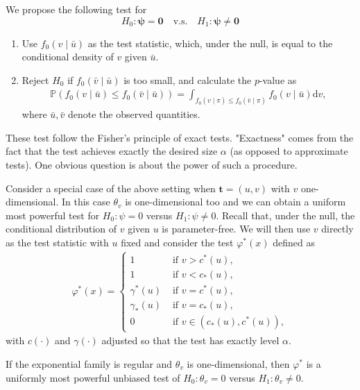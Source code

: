 We propose the following test for 
$$
H_0: \boldsymbol{\psi}=\mathbf{0}\quad \text{v.s.}\quad H_1: \boldsymbol{\psi} \neq \mathbf{0}
$$
\begin{enumerate}
    \item Use $f_0(v \mid \bar{u})$ as the test statistic, which, under the null, is equal to the conditional density of $v$ given $\bar{u}$.
    \item Reject $H_0$ if $f_0(\bar{v} \mid \bar{u})$ is too small, and calculate the $p$-value as
\begin{align*}
\mathbb{P}\left(f_0(v \mid \bar{u}) \leq f_0(\bar{v} \mid \bar{u})\right)=\int_{f_0(v \mid \pi) \leq f_0(\bar{v} \mid \pi)} f_0(v \mid \bar{u}) \mathrm{d} v,
\end{align*}
where $\bar{u}, \bar{v}$ denote the observed quantities.
\end{enumerate}


\begin{remark}
    These test follow the Fisher's principle of exact tests. "Exactness" comes from the fact that the test achieves exactly the desired size $\alpha$ (as opposed to approximate tests). One obvious question is about the power of such a procedure.
\end{remark}


Consider a special case of the above setting when $\mathbf{t}=(u, v)$ with $v$ one-dimensional. In this case $\theta_v$ is one-dimensional too and we can obtain a uniform most powerful test for $H_0: \psi=0$ versus $H_1: \psi \neq 0$. Recall that, under the null, the conditional distribution of $v$ given $u$ is parameter-free. We will then use $v$ directly as the test statistic with $u$
fixed and consider the test $\varphi^*(x)$ defined as
\begin{align*}
\varphi^*(x)= \begin{cases}1 & \text { if } v>c^*(u), \\ 1 & \text { if } v<c_*(u), \\ \gamma^*(u) & \text { if } v=c^*(u), \\ \gamma_*(u) & \text { if } v=c_*(u), \\ 0 & \text { if } v \in\left(c_*(u), c^*(u)\right),\end{cases}
\end{align*}
with $c(\cdot)$ and $\gamma(\cdot)$ adjusted so that the test has exactly level $\alpha$.
\begin{thm}
    If the exponential family is regular and $\theta_v$ is one-dimensional, then $\varphi^*$ is a uniformly most powerful unbiased test of $H_0: \theta_v=0$ versus $H_1: \theta_v \neq 0$.
\end{thm}

